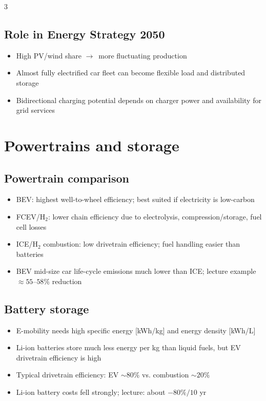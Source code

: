 \documentclass[9pt, landscape, a4paper]{article}
\let\mathto\to
\renewcommand{\to}{\ensuremath{\mathto}\ }
\begin{document}
\begin{multicols*}{3}
\subsection{Role in Energy Strategy 2050}
\begin{itemize}
  \item High PV/wind share \to more fluctuating production
  \item Almost fully electrified car fleet can become flexible load and distributed storage
  \item Bidirectional charging potential depends on charger power and availability for grid services
\end{itemize}

\newcolumn
\section{Powertrains and storage}
\subsection{Powertrain comparison}
\begin{itemize}
  \item BEV: highest well-to-wheel efficiency; best suited if electricity is low-carbon
  \item FCEV/H$_2$: lower chain efficiency due to electrolysis, compression/storage, fuel cell losses
  \item ICE/H$_2$ combustion: low drivetrain efficiency; fuel handling easier than batteries
  \item BEV mid-size car life-cycle emissions much lower than ICE; lecture example $\approx 55$--$58\%$ reduction
\end{itemize}

\subsection{Battery storage}
\begin{itemize}
  \item E-mobility needs high specific energy [kWh/kg] and energy density [kWh/L]
  \item Li-ion batteries store much less energy per kg than liquid fuels, but EV drivetrain efficiency is high
  \item Typical drivetrain efficiency: EV $\sim 80\%$ vs. combustion $\sim 20\%$
  \item Li-ion battery costs fell strongly; lecture: about $-80\%/10$ yr
\end{itemize}


\end{multicols*}
\end{document}
